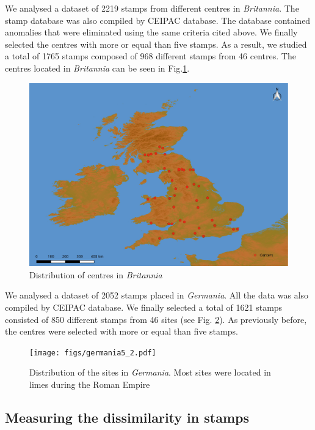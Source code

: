 \documentclass[review]{elsarticle}
\begin{document}
We analysed a dataset of 2219 stamps from different centres in \textit{Britannia}. 
The stamp database was also compiled by CEIPAC database. The database contained anomalies that were eliminated using the same criteria cited above. We finally selected the centres with more or equal than five stamps. As a result, we studied a total of 1765 stamps composed of 968 different stamps from 46 centres.
The centres located in \textit{Britannia} can be seen in Fig.\ref{britannia}.
 
\begin{figure}[htp]
	\centering
\includegraphics[width=\linewidth]{figs/britmap2.pdf}
\caption{Distribution of centres in \textit{Britannia}}
\label{britannia}
\end{figure} 


We analysed a dataset of 2052 stamps placed in \textit{Germania}. All the data was also compiled by CEIPAC database. We finally selected a total of 1621 stamps consisted of 850 different stamps from 46 sites (see Fig. \ref{germania}). As previously before, the centres were selected with more or equal than five stamps. 


\begin{figure}[htp]
	\centering
\texttt{[image: figs/germania5\_2.pdf]}
\caption{Distribution of the sites in \textit{Germania}. Most sites were located in limes during the Roman Empire}
\label{germania}
\end{figure}



\subsection{Measuring the dissimilarity in stamps}
\end{document}
